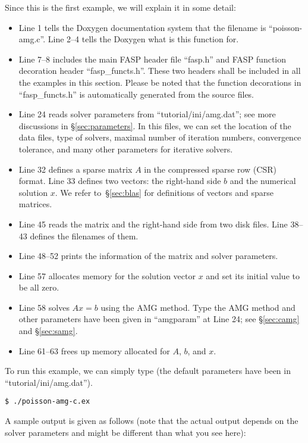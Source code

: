 \documentclass[11pt]{memoir}
\begin{document}
%
Since this is the first example, we will explain it in some detail:
\begin{itemize}
%
\item Line 1 tells the Doxygen documentation system that the filename is ``poisson-amg.c''. Line 2--4 tells the Doxygen what is this function for. 
%
\item Line 7--8 includes the main FASP header file ``fasp.h'' and FASP function decoration header ``fasp\_functs.h''. These two headers shall be included in all the examples in this section. Please be noted that the function decorations in ``fasp\_functs.h'' is automatically generated from the source files. 
%
\item Line 24 reads solver parameters from ``tutorial/ini/amg.dat''; see more discussions in \S\ref{sec:parameters}. In this files, we can set the location of the data files, type of solvers, maximal number of iteration numbers, convergence tolerance, and many other parameters for iterative solvers. 
%
\item Line 32 defines a sparse matrix $A$ in the compressed sparse row (CSR) format. Line 33 defines two vectors: the right-hand side $b$ and the numerical solution $x$. We refer to~\S\ref{sec:blas} for definitions of vectors and sparse matrices.
%
\item Line 45 reads the matrix and the right-hand side from two disk files. Line 38--43 defines the filenames of them.
%
\item Line 48--52 prints the information of the matrix and solver parameters. 
%
\item Line 57 allocates memory for the solution vector $x$ and set its initial value to be all zero. 
%
\item Line 58 solves $Ax=b$ using the AMG method. Type the AMG method and other parameters have been given in ``amgparam'' at Line 24; see \S\ref{sec:camg} and \S\ref{sec:samg}.
%
\item Line 61--63 frees up memory allocated for $A$, $b$, and $x$.
\end{itemize}
%
To run this example, we can simply type (the default parameters have been in ``tutorial/ini/amg.dat'').
%
\begin{lstlisting}[numbers=none]
$ ./poisson-amg-c.ex
\end{lstlisting}
%
A sample output is given as follows (note that the actual output depends on the solver parameters and might be different than what you see here):
\end{document}
